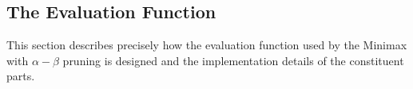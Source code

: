 \documentclass[12pt,a4paper]{article}
\begin{document}




\subsection{The Evaluation Function}
This section describes precisely how the evaluation function used by the Minimax with $\alpha-\beta$ pruning is designed and the implementation details of the constituent parts.
\end{document}
